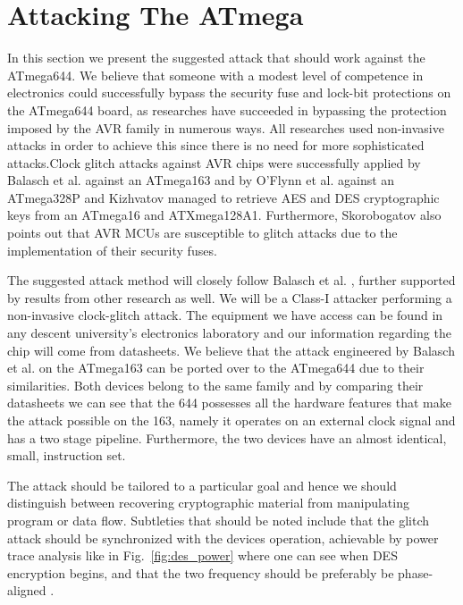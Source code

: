 \section{Attacking The ATmega}
\label{sec:attacking_mega}

In this section we present the suggested attack that should work against the ATmega644. We believe that someone with a modest level of competence in electronics could successfully bypass the security fuse and lock-bit protections on the ATmega644 board, as researches have succeeded in bypassing the protection imposed by the AVR family in numerous ways. All researches used non-invasive attacks in order to achieve this since there is no need for more sophisticated attacks.Clock glitch attacks against AVR chips were successfully applied by Balasch et al. \citep{glitches_paper} against an ATmega163 and by O'Flynn et al. \citep{chipwhisperer} against an ATmega328P and Kizhvatov \citep{avr_mega} managed to retrieve AES and DES cryptographic keys from an ATmega16 and ATXmega128A1. Furthermore, Skorobogatov \citep{sergei:thesis} also points out that AVR MCUs are susceptible to glitch attacks due to the implementation of their security fuses. 

The suggested attack method will closely follow Balasch et al. \citep{glitches_paper}, further supported by results from other research as well. We will be a Class-I attacker performing a non-invasive clock-glitch attack. The equipment we have access can be found in any descent university's electronics laboratory and our information regarding the chip will come from datasheets. We believe that the attack engineered by Balasch et al. \citep{glitches_paper} on the ATmega163 can be ported over to the ATmega644 due to their similarities. Both devices belong to the same family and by comparing their datasheets we can see that the 644 possesses all the hardware features that make the attack possible on the 163, namely it operates on an external clock signal and has a two stage pipeline\citep{glitches_paper}. Furthermore, the two devices have an almost identical, small, instruction set.

The attack should be tailored to a particular goal and hence we should distinguish between recovering cryptographic material from manipulating program or data flow. Subtleties that should be noted include that the glitch attack should be synchronized with the devices operation, achievable by power trace analysis like in  Fig.~\ref{fig:des_power} where one can see when DES encryption begins, and that the two frequency should be preferably be phase-aligned \citep{glitches_paper}\citep{sergei:thesis}\citep{avr_mega}. 

